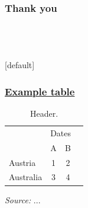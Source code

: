 \documentclass[12pt, ngerman]{beamer}
\makeatletter
\let\beamer@writeslidentry@miniframeson=\beamer@writeslidentry
\def\beamer@writeslidentry@miniframesoff{%
  \expandafter\beamer@ifempty\expandafter{\beamer@framestartpage}{}%
  {%
    \clearpage\beamer@notesactions%
  }
}
\newcommand*{\miniframeson}{\let\beamer@writeslidentry=\beamer@writeslidentry@miniframeson}
\newcommand*{\miniframesoff}{\let\beamer@writeslidentry=\beamer@writeslidentry@miniframesoff}
\makeatother
\begin{document}
\miniframesoff

\section{}
\begin{frame}
\frametitle{Thank you}
 \\
\vspace{0.5cm}
\end{frame}

\showpagenumbersfalse


\section{}

\makeatletter
    [default]
    \def\beamer@entrycode{\vspace*{-\headheight}}
\makeatother
\begin{frame}[label=ex_table,noframenumbering]
\frametitle{\hyperlink{introapp}{Example table}}
\begin{table} %
\vspace{-0.5cm}
\scriptsize %
\setlength\tabcolsep{3.5pt}
\centering
\begin{threeparttable}
\caption{Header.} \label{tab:header}
\begin{tabular}{l *{3}{c}}
\hline
\addlinespace \multicolumn{1}{l}{Country} & \multicolumn{2}{c}{Dates} \\
\cmidrule(lr){2-3}
&\multicolumn{1}{c}{A}&\multicolumn{1}{c}{B} \\
\hline
\addlinespace
Austria&         1&         2\\
Australia&         3&         4\\
\hline
\end{tabular}
\begin{tablenotes}
\item \textit{Source:} ...
\end{tablenotes}
\end{threeparttable}
\end{table}
\vspace{0.5cm}
\hyperlink{ex_slide}{} \\
\end{frame}
\end{document}
